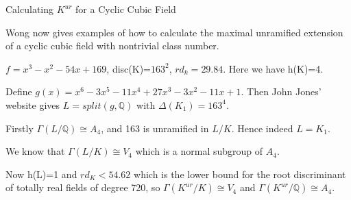 \documentclass[10pt]{beamer}
\theoremstyle{plain} %
\begin{document}
\begin{frame}{Calculating $K^{ur}$ for a Cyclic Cubic Field}
\pause

    Wong now gives examples of how to calculate the maximal unramified extension of a cyclic cubic field with nontrivial class number.
    \pause
\begin{example}
\pause
    $f=x^3-x^2-54x+169$, disc(K)=$163^2$, $rd_{k}=29.84$. Here we have h(K)=4.\par \pause

    
    Define $g(x)=x^6-3x^5-11x^4+27x^3-3x^2-11x+1$. Then John Jones' website gives $L = split(g,\mathbb{Q})$ with $\Delta(K_1)=163^4$.\par \pause
 Firstly $\Gamma(L/\mathbb{Q}) \cong A_4$, and 163 is unramified in $L/K$. Hence indeed $L=K_1$.\par \pause
 We know that $\Gamma(L/K)\cong V_4$ which is a normal subgroup of $A_4$. \par \pause
Now h(L)=1 and $rd_K < 54.62$ which is the lower bound for the root discriminant of totally real fields of degree 720, so $\Gamma(K^{ur}/K) \cong V_4$ and $\Gamma(K^{ur}/\mathbb{Q}) \cong A_4$. 
\end{example}
\end{frame}
\end{document}
